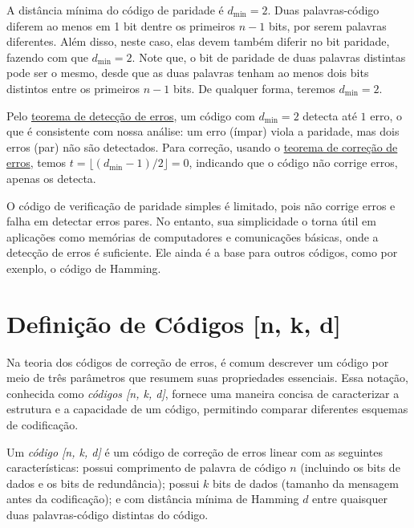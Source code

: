 A distância mínima do código de paridade é $d_{\text{min}} = 2$. 
Duas palavras-código diferem ao menos em 1 bit dentre os primeiros $n-1$ bits,
por serem palavras diferentes. Além disso, neste caso, elas devem também diferir
no bit paridade, fazendo com que $d_{\text{min}} = 2$. Note que, o bit de 
paridade de duas palavras distintas pode ser o mesmo, desde que as duas palavras
tenham ao menos dois bits distintos entre os primeiros $n-1$ bits. 
De qualquer forma, teremos $d_{\text{min}} = 2$.

Pelo \hyperref[thm:deteccaoerros]{teorema de detecção de erros},  
um código com $d_{\text{min}} = 2$ detecta até $1$ erro, o que é consistente com
nossa análise: um erro (ímpar) viola a paridade, mas dois erros (par) não são
detectados. Para correção, usando o \hyperref[thm:correcaoerros]{teorema de correção de erros}, 
temos $t = \lfloor (d_{\text{min}} - 1)/2 \rfloor = 0$,
indicando que o código não corrige erros, apenas os detecta.

O código de verificação de paridade simples é limitado, pois não corrige erros
e falha em detectar erros pares. No entanto, sua simplicidade o torna útil em
aplicações como memórias de computadores e comunicações básicas, onde a
detecção de erros é suficiente. Ele ainda é a base para outros códigos,
como por exenplo, o código de Hamming. 





\section{Definição de Códigos [n, k, d]}

Na teoria dos códigos de correção de erros, é comum descrever um código por
meio de três parâmetros que resumem suas propriedades essenciais.
Essa notação, conhecida como \emph{códigos [n, k, d]}, fornece uma maneira
concisa de caracterizar a estrutura e a capacidade de um código, permitindo
comparar diferentes esquemas de codificação.

\begin{definition}\label{def:codnkd}
Um \emph{código [n, k, d]} é um código de correção de erros linear com as seguintes características:
possui comprimento de palavra de código $n$ (incluindo os bits de dados e os bits de redundância);
possui $k$ bits de dados (tamanho da mensagem antes da codificação);
e com distância mínima de Hamming $d$ entre quaisquer duas palavras-código distintas do código.
\end{definition}

